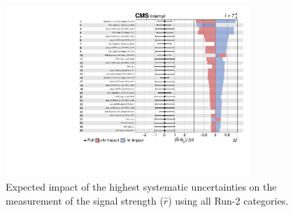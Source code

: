 \begin{figure}[ht!]
\centering
\includegraphics[width=0.82\textwidth,page=1]{Figures/Results/systematics/impacts_sig_inj7p2_expected.pdf}
\caption[Expected impact of the highest systematic uncertainties on the measurement of the signal strength]{Expected impact of the highest systematic uncertainties on the measurement of the signal strength ($\hat{r}$) using all Run-2 categories.}
\label{fig:syst:expectedimpacts}
\end{figure}
